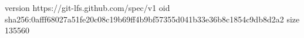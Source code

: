 version https://git-lfs.github.com/spec/v1
oid sha256:0afff68027a51fe20c08c19b69ff4b9bf57355d041b33e36b8c1854c9db8d2a2
size 135560
